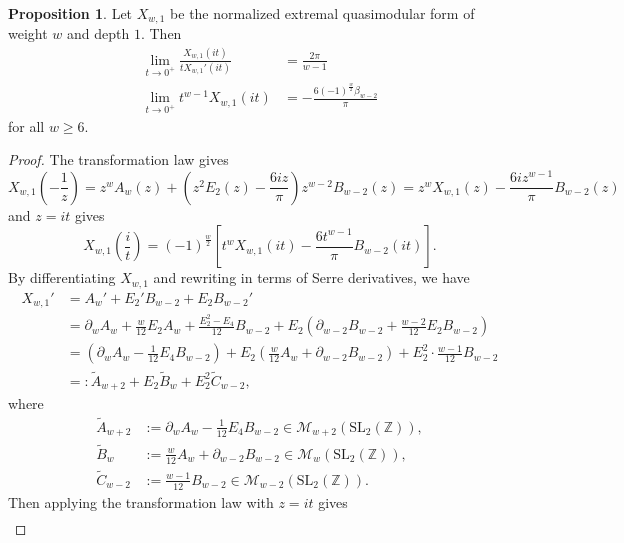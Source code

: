 \documentclass[10pt,reqno]{amsproc}
\newcommand{\SL}{\mathrm{SL}}
\newcommand{\bZ}{\mathbb{Z}}
\newcommand{\cM}{\mathcal{M}}
\newcommand{\1}{\mathds{1}}	%
\theoremstyle{definition}
\newtheorem{proposition}[theorem]{Proposition}
\theoremstyle{remark}
\begin{document}
\begin{proposition}
    \label{prop:Xw1limit}
    Let $X_{w, 1}$ be the normalized extremal quasimodular form of weight $w$ and depth $1$.
    Then
    \begin{align}
        \lim_{t \to 0^+} \frac{X_{w, 1}(it)}{t X_{w, 1}'(it)} &= \frac{2\pi}{w-1} \label{eqn:extremallimit} \\
        \lim_{t \to 0^+} t^{w-1} X_{w, 1}(it) &= -\frac{6(-1)^{\frac{w}{2}}\beta_{w-2}}{\pi} \label{eqn:extremallimit2}
    \end{align}
    for all $w \ge 6$.
\end{proposition}
\begin{proof}
    The transformation law gives
    \[
        X_{w, 1}\left(-\frac{1}{z}\right) = z^w A_w(z) + \left(z^2 E_2(z) - \frac{6iz}{\pi}\right) z^{w-2}B_{w-2}(z) = z^w X_{w, 1}(z) - \frac{6iz^{w-1}}{\pi} B_{w-2}(z)
    \]
    and $z = it$ gives
    \begin{equation}
        X_{w,1} \left(\frac{i}{t}\right) = (-1)^{\frac{w}{2}}\left[t^w X_{w, 1}(it) - \frac{6 t^{w-1}}{\pi} B_{w-2}(it)\right]. \label{eqn:Xw1trans}
    \end{equation}
    By differentiating $X_{w, 1}$ and rewriting in terms of Serre derivatives, we have
    \begin{align*}
        X_{w, 1}' &= A_{w}' + E_2' B_{w-2} + E_2 B_{w-2}' \\
        &= \partial_w A_w + \frac{w}{12} E_2 A_{w} + \frac{E_2^2 - E_4}{12} B_{w-2} + E_2 \left(\partial_{w-2} B_{w-2} + \frac{w-2}{12} E_2 B_{w-2}\right) \\
        &= \left(\partial_{w} A_{w} - \frac{1}{12} E_4 B_{w-2}\right) + E_2 \left(\frac{w}{12} A_w + \partial_{w-2} B_{w-2}\right) + E_2^2 \cdot \frac{w-1}{12} B_{w-2} \\
        &=: \widetilde{A}_{w+2} + E_2 \widetilde{B}_{w} + E_2^2 \widetilde{C}_{w-2},
    \end{align*}
    where
    \begin{align*}
        \widetilde{A}_{w+2} &:= \partial_{w} A_{w} - \frac{1}{12} E_4 B_{w-2} \in \cM_{w+2}(\SL_2(\bZ)), \\
        \widetilde{B}_{w} &:= \frac{w}{12} A_w + \partial_{w-2} B_{w-2} \in \cM_{w}(\SL_2(\bZ)), \\
        \widetilde{C}_{w-2} &:= \frac{w-1}{12} B_{w-2} \in \cM_{w-2}(\SL_2(\bZ)).
    \end{align*}
    Then applying the transformation law with $z = it$ gives
    \begin{align}

\end{align}
\end{proof}
\end{document}

